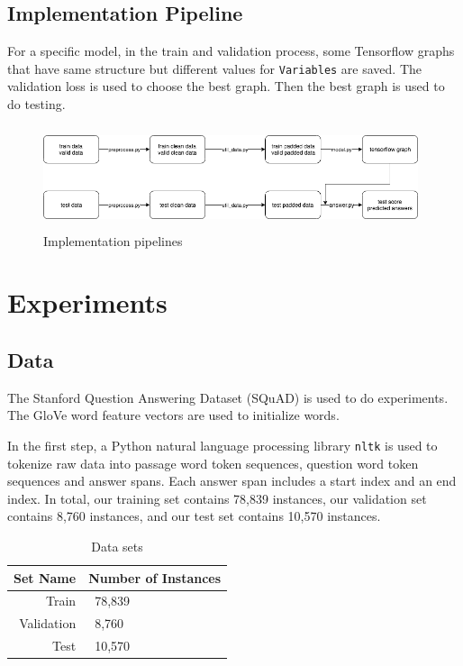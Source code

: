 \documentclass[modernstyle,12pt]{sjsuthesis}
\theoremstyle{definition}
\begin{document}
\section{Implementation Pipeline}

For a specific model, in the train and validation process, some Tensorflow graphs that have same structure but different values for {\tt Variables} are saved. The validation loss is used to choose the best graph. Then the best graph is used to do testing.

\begin{figure}[htbp]\centering
  \includegraphics[width=11cm, height=3cm]{figures/pipeline.png}
  \caption{Implementation pipelines}
  \label{f:pipeline}
\end{figure}


\chapter{Experiments}
\section{Data}
The Stanford Question Answering Dataset (SQuAD) is used to do experiments. The GloVe word feature vectors\cite{pennington2014glove} are used to initialize words.

In the first step, a Python natural language processing library {\tt nltk} is used to tokenize raw data into passage word token sequences, question word token sequences and answer spans. Each answer span includes a start index and an end index. In total, our training set contains 78,839 instances, our validation set contains 8,760 instances, and our test set contains 10,570 instances.

\begin{table}[htbp]\centering
  \caption{Data sets}
  \label{tab:dataset}
  \begin{tabular}{|r|l|} \hline
    Set Name & Number of Instances \\ \hline\hline
    Train & \ 78,839 \\
    Validation & \ 8,760 \\
    Test & \ 10,570 \\ \hline
  \end{tabular}
\end{table}
\end{document}
